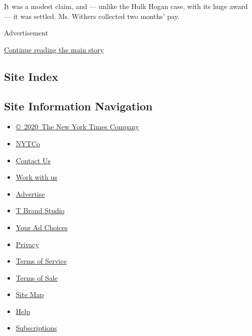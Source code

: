 It was a modest claim, and --- unlike the Hulk Hogan case, with its huge
award --- it was settled. Ms. Withers collected two months' pay.

Advertisement

\protect\hyperlink{after-bottom}{Continue reading the main story}

\hypertarget{site-index}{%
\subsection{Site Index}\label{site-index}}

\hypertarget{site-information-navigation}{%
\subsection{Site Information
Navigation}\label{site-information-navigation}}

\begin{itemize}
\tightlist
\item
  \href{https://help.nytimes3xbfgragh.onion/hc/en-us/articles/115014792127-Copyright-notice}{©~2020~The
  New York Times Company}
\end{itemize}

\begin{itemize}
\tightlist
\item
  \href{https://www.nytco.com/}{NYTCo}
\item
  \href{https://help.nytimes3xbfgragh.onion/hc/en-us/articles/115015385887-Contact-Us}{Contact
  Us}
\item
  \href{https://www.nytco.com/careers/}{Work with us}
\item
  \href{https://nytmediakit.com/}{Advertise}
\item
  \href{http://www.tbrandstudio.com/}{T Brand Studio}
\item
  \href{https://www.nytimes3xbfgragh.onion/privacy/cookie-policy\#how-do-i-manage-trackers}{Your
  Ad Choices}
\item
  \href{https://www.nytimes3xbfgragh.onion/privacy}{Privacy}
\item
  \href{https://help.nytimes3xbfgragh.onion/hc/en-us/articles/115014893428-Terms-of-service}{Terms
  of Service}
\item
  \href{https://help.nytimes3xbfgragh.onion/hc/en-us/articles/115014893968-Terms-of-sale}{Terms
  of Sale}
\item
  \href{https://spiderbites.nytimes3xbfgragh.onion}{Site Map}
\item
  \href{https://help.nytimes3xbfgragh.onion/hc/en-us}{Help}
\item
  \href{https://www.nytimes3xbfgragh.onion/subscription?campaignId=37WXW}{Subscriptions}
\end{itemize}

